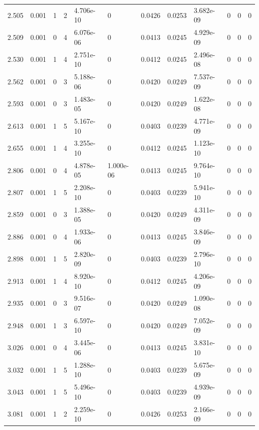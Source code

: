 \documentclass[preview]{standalone}
\begin{document}
{{{\begin{tabular}{L{1.2cm}C{1.2cm} C{0.3cm}C{0.5cm} C{1.4cm}C{1.4cm} C{1.4cm}C{1.4cm} C{1.6cm}C{1.6cm} C{1.6cm}C{1.6cm}}
  2.505  &  0.001  & 1     &  2 &  4.706e-10  & 0  &  0.0426&   0.0253& 3.682e-09 & 0   &  0 & 0  \\ 
  2.509  &  0.001  & 0     &  4 &  6.076e-06  & 0  &  0.0413&   0.0245& 4.929e-09 & 0   &  0 & 0  \\ 
  2.530  &  0.001  & 1     &  4 &  2.751e-10  & 0  &  0.0412&   0.0245& 2.496e-08 & 0   &  0 & 0  \\ 
  2.562  &  0.001  & 0     &  3 &  5.188e-06  & 0  &  0.0420&   0.0249& 7.537e-09 & 0   &  0 & 0  \\ 
  2.593  &  0.001  & 0     &  3 &  1.483e-05  & 0  &  0.0420&   0.0249& 1.622e-08 & 0   &  0 & 0  \\ 
  2.613  &  0.001  & 1     &  5 &  5.167e-10  & 0  &  0.0403&   0.0239& 4.771e-09 & 0   &  0 & 0  \\ 
  2.655  &  0.001  & 1     &  4 &  3.255e-10  & 0  &  0.0412&   0.0245& 1.123e-10 & 0   &  0 & 0  \\ 
  2.806  &  0.001  & 0     &  4 &  4.878e-05  & 1.000e-06  &  0.0413&   0.0245& 9.764e-10 & 0   &  0 & 0  \\ 
  2.807  &  0.001  & 1     &  5 &  2.208e-10  & 0  &  0.0403&   0.0239& 5.941e-10 & 0   &  0 & 0  \\ 
  2.859  &  0.001  & 0     &  3 &  1.388e-05  & 0  &  0.0420&   0.0249& 4.311e-09 & 0   &  0 & 0  \\ 
  2.886  &  0.001  & 0     &  4 &  1.933e-06  & 0  &  0.0413&   0.0245& 3.846e-09 & 0   &  0 & 0  \\ 
  2.898  &  0.001  & 1     &  5 &  2.820e-09  & 0  &  0.0403&   0.0239& 2.796e-10 & 0   &  0 & 0  \\ 
  2.913  &  0.001  & 1     &  4 &  8.920e-10  & 0  &  0.0412&   0.0245& 4.206e-09 & 0   &  0 & 0  \\ 
  2.935  &  0.001  & 0     &  3 &  9.516e-07  & 0  &  0.0420&   0.0249& 1.090e-08 & 0   &  0 & 0  \\ 
  2.948  &  0.001  & 1     &  3 &  6.597e-10  & 0  &  0.0420&   0.0249& 7.052e-09 & 0   &  0 & 0  \\ 
  3.026  &  0.001  & 0     &  4 &  3.445e-06  & 0  &  0.0413&   0.0245& 3.831e-10 & 0   &  0 & 0  \\ 
  3.032  &  0.001  & 1     &  5 &  1.288e-10  & 0  &  0.0403&   0.0239& 5.675e-09 & 0   &  0 & 0  \\ 
  3.043  &  0.001  & 1     &  5 &  5.496e-10  & 0  &  0.0403&   0.0239& 4.939e-09 & 0   &  0 & 0  \\ 
  3.081  &  0.001  & 1     &  2 &  2.259e-10  & 0  &  0.0426&   0.0253& 2.166e-09 & 0   &  0 & 0  \\ 

\end{tabular}}}}
\end{document}

